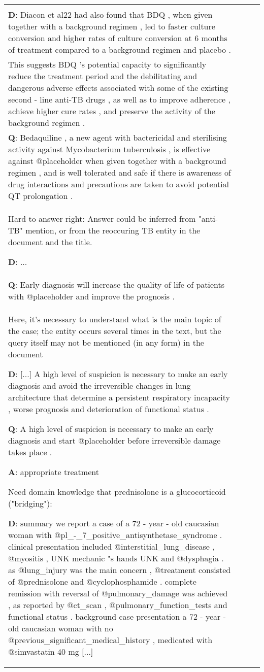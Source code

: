 \documentclass[11pt,a4paper]{article}
\begin{document}
\begin{table}[t]
\begin{tabular}{p{2.7cm} p{1.8cm} l r}
{\begin{comment}
Requiring inference:\\
\textbf{D}: Diacon et al22 had also found that BDQ , when given together with a background regimen , led to faster culture conversion and higher rates of culture conversion at 6 months of treatment compared to a background regimen and placebo .\\
This suggests BDQ 's potential capacity to significantly reduce the treatment period and the debilitating and dangerous adverse effects associated with some of the existing second - line anti-TB drugs , as well as to improve adherence , achieve higher cure rates , and preserve the activity of the background regimen .\\
\textbf{Q}: Bedaquiline , a new agent with bactericidal and sterilising activity against Mycobacterium tuberculosis , is effective against @placeholder when given together with a background regimen , and is well tolerated and safe if there is awareness of drug interactions and precautions are taken to avoid potential QT prolongation .\\
Hard to answer right: Answer could be inferred from "anti-TB" mention, or from the reoccuring TB entity in the document and the title.

\textbf{D}: ...\\
\textbf{Q}: Early diagnosis will increase the quality of life of patients with @placeholder and improve the prognosis .\\
Here, it's necessary to understand what is the main topic of the case; the entity occurs several times in the text, but the query itself may not be mentioned (in any form) in the document

\textbf{D}: [...] A high level of suspicion is necessary to make an early diagnosis and avoid the irreversible changes in lung architecture that determine a persistent respiratory incapacity , worse prognosis and deterioration of functional status .

\textbf{Q}: A high level of suspicion is necessary to make an early diagnosis and start @placeholder before irreversible damage takes place .

\textbf{A}: appropriate treatment


Need domain knowledge that prednisolone is a glucocorticoid ("bridging"):

\textbf{D}: summary we report a case of a 72 - year - old caucasian woman with @pl\_-\_7\_positive\_antisynthetase\_syndrome . clinical presentation included @interstitial\_lung\_disease , @myositis , UNK mechanic "s hands UNK and @dysphagia . as @lung\_injury was the main concern , @treatment consisted of @prednisolone and @cyclophosphamide . complete remission with reversal of @pulmonary\_damage was achieved , as reported by @ct\_scan , @pulmonary\_function\_tests and functional status . background case presentation a 72 - year - old caucasian woman with no @previous\_significant\_medical\_history , medicated with @simvastatin 40 mg [...]


\end{comment}}
\end{tabular}
\end{table}
\end{document}
